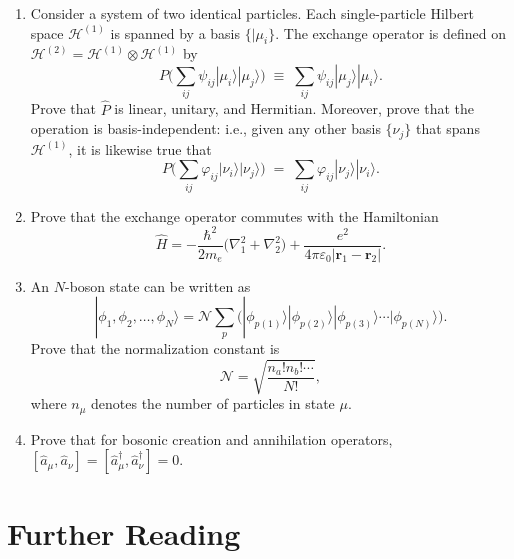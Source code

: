 \documentclass[pra,12pt]{revtex4}
\begin{document}
\begin{enumerate}
\item Consider a system of two identical particles.  Each
  single-particle Hilbert space $\mathscr{H}^{(1)}$ is spanned by a
  basis $\{|\mu_i\}$.  The exchange operator is defined on
  $\mathscr{H}^{(2)} = \mathscr{H}^{(1)} \otimes \mathscr{H}^{(1)}$ by
$$P \Big (\sum_{ij} \psi_{ij} |\mu_i\rangle|\mu_j\rangle \Big)
  \;\equiv\;  \sum_{ij} \psi_{ij} |\mu_j\rangle|\mu_i\rangle.$$
  Prove that $\hat{P}$ is linear, unitary, and Hermitian.  Moreover,
  prove that the operation is basis-independent: i.e., given any other
  basis $\{\nu_j\}$ that spans $\mathscr{H}^{(1)}$, it is likewise
  true that
$$P \Big (\sum_{ij} \varphi_{ij} |\nu_i\rangle|\nu_j\rangle \Big)
  \;=\;  \sum_{ij} \varphi_{ij} |\nu_j\rangle|\nu_i\rangle.$$
  \label{ex:1}

\item
  Prove that the exchange operator commutes with the Hamiltonian
$$\hat{H} = - \frac{\hbar^2}{2m_e} \Big(\nabla_1^2 + \nabla^2_2\Big) + \frac{e^2}{4\pi\varepsilon_0|\mathbf{r}_1 - \mathbf{r}_2|}.$$ \label{ex:2}

\item
  An $N$-boson state can be written as
$$|\phi_1,\phi_2,\dots,\phi_N\rangle = \mathcal{N} \sum_p \Big(|\phi_{p(1)}\rangle  |\phi_{p(2)}\rangle  |\phi_{p(3)}\rangle  \cdots  |\phi_{p(N)}\rangle\Big).$$
  Prove that the normalization constant is
$$\mathcal{N} = \sqrt{\frac{n_a!n_b!\cdots}{N!}},$$
  where $n_\mu$ denotes the number of particles in state $\mu$.
  \label{ex:boson_norm}

\item
  Prove that for bosonic creation and annihilation operators, $[\hat{a}_\mu,\hat{a}_\nu] = [\hat{a}_\mu^\dagger,\hat{a}_\nu^\dagger] = 0$.
  \label{ex:boson_commutators}
  
\end{enumerate}

\section*{Further Reading}

\end{document}
